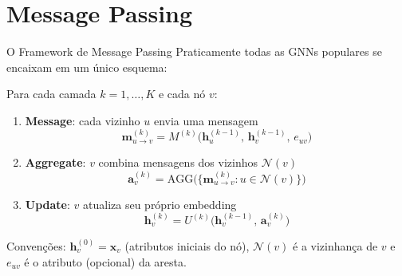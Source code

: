 \documentclass[aspectratio=169,xcolor=dvipsnames]{beamer}
\begin{document}
  \section{Message Passing}

  \begin{frame}{O Framework de Message Passing}
    Praticamente todas as GNNs populares se encaixam em um único esquema:

    \begin{block}{Para cada camada $k = 1, \ldots, K$ e cada nó $v$:}
      \begin{enumerate}
        \item \textbf{Message}: cada vizinho $u$ envia uma mensagem
          \[
            \mathbf{m}^{(k)}_{u \to v} = M^{(k)}\!\bigl(\mathbf{h}^{(k-1)}_u,\, \mathbf{h}^{(k-1)}_v,\, e_{uv}\bigr)
          \]
        \item \textbf{Aggregate}: $v$ combina mensagens dos vizinhos $\mathcal{N}(v)$
          \[
            \mathbf{a}^{(k)}_v = \mathrm{AGG}\!\bigl(\{\mathbf{m}^{(k)}_{u \to v} : u \in \mathcal{N}(v)\}\bigr)
          \]
        \item \textbf{Update}: $v$ atualiza seu próprio embedding
          \[
            \mathbf{h}^{(k)}_v = U^{(k)}\!\bigl(\mathbf{h}^{(k-1)}_v,\, \mathbf{a}^{(k)}_v\bigr)
          \]
      \end{enumerate}
    \end{block}
    {\footnotesize Convenções: $\mathbf{h}^{(0)}_v = \mathbf{x}_v$ (atributos iniciais do nó), $\mathcal{N}(v)$ é a vizinhança de $v$ e $e_{uv}$ é o atributo (opcional) da aresta.}
  \end{frame}
\end{document}
